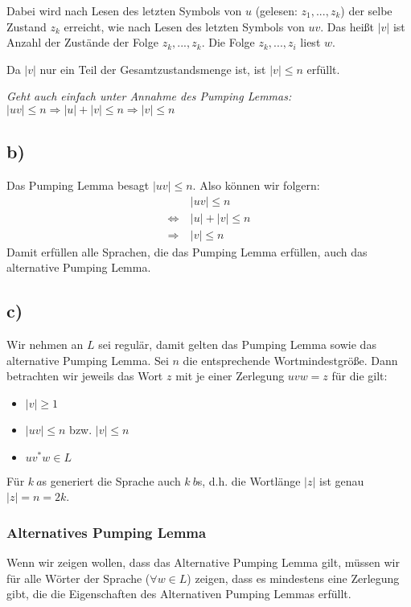 \documentclass{article}
\begin{document}
Dabei wird nach Lesen des letzten Symbols von $u$ (gelesen: $z_1,...,z_k$) der selbe Zustand $z_k$ erreicht, wie nach Lesen des letzten Symbols von $uv$. Das heißt $|v|$ ist Anzahl der Zustände der Folge $z_k, ...,z_k$. Die Folge $z_k,...,z_i$ liest $w$.

Da $|v|$ nur ein Teil der Gesamtzustandsmenge ist, ist $|v| \leq n$ erfüllt.

\vspace{1em} \textit{Geht auch einfach unter Annahme des Pumping Lemmas: \\$|uv|\leq n \Rightarrow |u|+|v|\leq n \Rightarrow |v| \leq n$}


\subsection*{b)}
Das Pumping Lemma besagt $|uv| \leq n$. Also können wir folgern:
\setcounter{equation}{0}
\begin{align}
                 & |uv| \leq n \\
\Leftrightarrow\ & |u|+|v| \leq n \\
\Rightarrow    \ & |v| \leq n
\end{align}
Damit erfüllen alle Sprachen, die das Pumping Lemma erfüllen, auch das alternative Pumping Lemma.


\subsection*{c)}
Wir nehmen an $L$ sei regulär, damit gelten das Pumping Lemma sowie das alternative Pumping Lemma. Sei $n$ die entsprechende Wortmindestgröße. Dann betrachten wir jeweils das Wort $z$ mit je einer Zerlegung $uvw=z$ für die gilt:

\begin{itemize}
	\item $|v| \geq 1$
	\item $|uv| \leq n$ bzw. $|v| \leq n$
	\item $uv^*w \in L$
\end{itemize}

Für $k\ a$s generiert die Sprache auch $k\ b$s, d.h. die Wortlänge $|z|$ ist genau $|z| = n = 2k$.

\subsubsection*{Alternatives Pumping Lemma}
Wenn wir zeigen wollen, dass das Alternative Pumping Lemma gilt, müssen wir für alle Wörter der Sprache ($\forall w \in L$) zeigen, dass es mindestens eine Zerlegung gibt, die die Eigenschaften des Alternativen Pumping Lemmas erfüllt.
\end{document}
